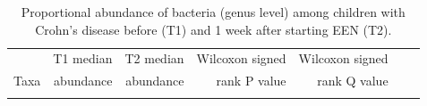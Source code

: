 \newpage
{\footnotesize
	\renewcommand{\arraystretch}{0.7} \setlength{\tabcolsep}{3pt}
	\begin{longtable}{ | l | r | r | r | r | r | r  | }
		\caption[ Proportional abundance of bacteria (genus level) among children with Crohn’s disease before (T1) and 1 week after starting EEN (T2) ]{ Proportional abundance of bacteria (genus level) among children with Crohn’s disease before (T1) and 1 week after starting EEN (T2).	} 
		\label{TS8} \\
		
		\hline 
		& T1  median& T2  median & Wilcoxon signed  & Wilcoxon signed \\ 
		Taxa & abundance & abundance & rank P value & rank Q value \\
		\hline 
		\endfirsthead
		
		
		\endfoot
		
		\hline 
		\endlastfoot
		

\end{longtable}}
